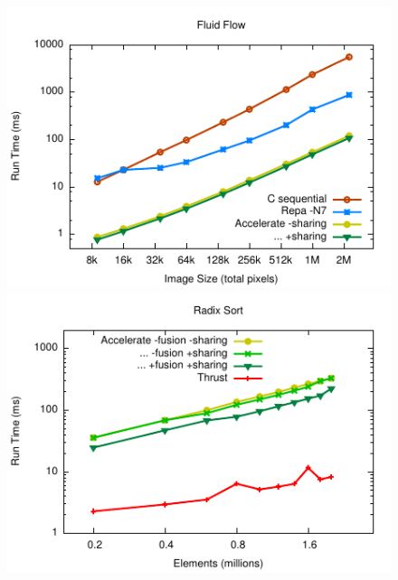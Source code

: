 \begin{figure}
\hspace{-1em}
\includegraphics[scale=1.2]{benchmarks/figs/fluid/fluid.pdf}
\includegraphics[scale=1.2]{benchmarks/figs/radixsort/radixsort.pdf}
\end{figure}

